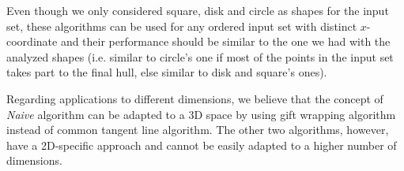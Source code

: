 \documentclass[letterpaper]{article}
\theoremstyle{definition}
\begin{document}
Even though we only considered square, disk and circle as shapes for the input set, these algorithms can be used for any ordered input set with distinct $x$-coordinate and their performance should be similar to the one we had with the analyzed shapes (i.e. similar to circle's one if most of the points in the input set takes part to the final hull, else similar to disk and square's ones).

Regarding applications to different dimensions, we believe that the concept of \textit{Naive} algorithm can be adapted to a 3D space by using gift wrapping algorithm instead of common tangent line algorithm.
The other two algorithms, however, have a 2D-specific approach and cannot be easily adapted to a higher number of dimensions.



\end{document}
